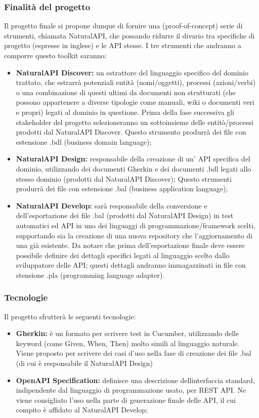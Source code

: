     \subsubsection{Finalità del progetto}
   Il progetto finale si propone dunque di fornire una (proof-of-concept) serie di strumenti,  chiamata NaturalAPI, che possando ridurre il divario tra specifiche di progetto (espresse in inglese) e le API stesse. I tre strumenti che andranno a comporre questo toolkit  saranno:
   \begin{itemize}
   	\item \textbf{NaturalAPI Discover: }un estrattore del linguaggio specifico del dominio trattato, che estrarrà potenziali entità (nomi/oggetti), processi (azioni/verbi) o una combinazione di questi ultimi da documenti non strutturati (che possono appartenere a diverse tipologie come manuali, wiki o documenti veri e propri) legati al dominio in questione. Prima della fase successiva gli stakeholder del progetto selezioneranno un sottoinsieme delle entitò/processi prodotti dal NaturalAPI Discover. Questo strumento produrrà dei file con estensione .bdl (business domain language);
   	
   	\item \textbf{NaturalAPI Design: }responsabile della creazione di un' API specifica del dominio, utilizzando dei documenti Gherkin e dei documenti .bdl legati allo stesso dominio (prodotti dal NaturalAPI Discover); Questo strumenti produrrà dei file con estensione .bal (business application language);
   	
   	\item \textbf{NaturalAPI Develop: }sarà responsabile della conversione e dell'esportazione dei file .bal (prodotti dal NaturalAPI Design) in test automatici ed API in uno dei linguaggi di programmazione/framework scelti, supportando sia la creazione di una nuova repository che l'aggiornamento di una già esistente. Da notare che prima dell'esportazione finale deve essere possibile definire dei dettagli specifici legati al linguaggio scelto dallo sviluppatore delle API; questi dettagli andranno immagazzinati in file con stensione .pla (programming language adapter).
   	\end{itemize}
    
    \subsubsection{Tecnologie}
     	Il progetto sfrutterà le seguenti tecnologie:
     	\begin{itemize}
     		\item \textbf{Gherkin: }è un formato per scrivere test in Cucumber, utilizzando delle keyword (come Given, When, Then) molto simili al linguaggio naturale. Viene proposto per scrivere dei casi d'uso nella fase di creazione dei file .bal (di cui è responsabile il NaturalAPI Design) 
     		\item \textbf{OpenAPI Specification: }definisce una descrizione dellinterfaccia standard, indipendente dal linguaggio di programmazione usato, per REST API. Ne viene consigliato l'uso nella parte di generazione finale delle API, il cui compito è affidato al NaturalAPI Develop;
     	\end{itemize}
